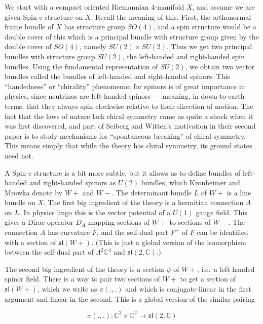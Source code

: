 \documentclass{article}
\begin{document}
We start with a compact oriented Riemannian 4-manifold \(X\), and assume
we are given Spin-c structure on \(X\). Recall the meaning of this.
First, the orthonormal frame bundle of \(X\) has structure group
\(SO(4)\), and a spin structure would be a double cover of this which is
a principal bundle with structure group given by the double cover of
\(SO(4)\), namely \(SU(2) \times SU(2)\). Thus we get two principal
bundles with structure group \(SU(2)\), the left-handed and right-handed
spin bundles. Using the fundamental representation of \(SU(2)\), we
obtain two vector bundles called the bundles of left-handed and
right-handed spinors. This ``handedness'' or ``chirality'' phenomenon
for spinors is of great importance in physics, since neutrinos are
left-handed spinors --- meaning, in down-to-earth terms, that they
always spin clockwise relative to their direction of motion. The fact
that the laws of nature lack chiral symmetry came as quite a shock when
it was first discovered, and part of Seiberg and Witten's motivation in
their second paper is to study mechanisms for ``spontaneous breaking''
of chiral symmetry. This means simply that while the theory has chiral
symmetry, its ground states need not.

A Spin-c structure is a bit more subtle, but it allows us to define
bundles of left-handed and right-handed spinors as \(U(2)\) bundles,
which Kronheimer and Mrowka denote by \(W+\) and \(W-\). The determinant
bundle \(L\) of \(W+\) is a line bundle on \(X\). The first big
ingredient of the theory is a hermitian connection \(A\) on \(L\). In
physics lingo this is the vector potential of a \(U(1)\) gauge field.
This gives a Dirac operator \(D_A\) mapping sections of \(W+\) to
sections of \(W-\). The connection \(A\) has curvature \(F\), and the
self-dual part \(F^+\) of \(F\) can be identified with a section of
\(\mathfrak{sl}(W+)\). (This is just a global version of the isomorphism
between the self-dual part of \(\Lambda^2 \mathbb{C}^4\) and
\(\mathfrak{sl}(2,\mathbb{C})\).)

The second big ingredient of the theory is a section \(\psi\) of \(W+\),
i.e.~a left-handed spinor field. There is a way to pair two sections of
\(W+\) to get a section of \(\mathfrak{sl}(W+)\), which we write as
\(\sigma(.,.)\) and which is conjugate-linear in the first argument and
linear in the second. This is a global version of the similar pairing

\[\sigma(.,.)\colon \mathbb{C}^2 \times \mathbb{C}^2 \to \mathfrak{sl}(2,\mathbb{C})\]
\end{document}
